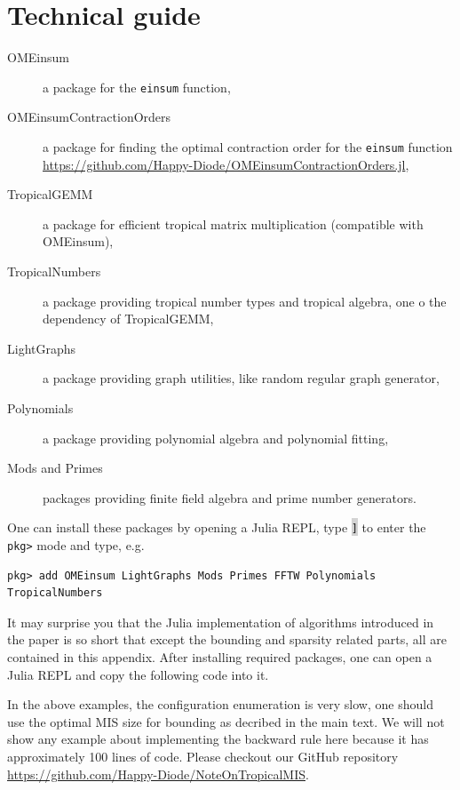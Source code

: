 \documentclass[review,onefignum,onetabnum]{siamart190516}
\newcommand{\<}{\langle}
\renewcommand{\>}{\rangle}
\newcounter{example}
\begin{document}



\appendix

\section{Technical guide}\label{sec:technical}
\begin{description}
	\item[OMEinsum] a package for the \texttt{einsum} function,
	\item[OMEinsumContractionOrders] a package for finding the optimal contraction order for the \texttt{einsum} function \\ \href{https://github.com/Happy-Diode/OMEinsumContractionOrders.jl}{https://github.com/Happy-Diode/OMEinsumContractionOrders.jl},
	\item[TropicalGEMM] a package for efficient tropical matrix multiplication (compatible with OMEinsum),
	\item[TropicalNumbers] a package providing tropical number types and tropical algebra, one o the dependency of TropicalGEMM,
	\item[LightGraphs] a package providing graph utilities, like random regular graph generator,
	\item[Polynomials] a package providing polynomial algebra and polynomial fitting,
	\item[Mods and Primes] packages providing finite field algebra and prime number generators.
\end{description}

One can install these packages by opening a Julia REPL, type \colorbox{lightgray}{\texttt{]}} to enter the \texttt{pkg>} mode and type, e.g.
\begin{lstlisting}
pkg> add OMEinsum LightGraphs Mods Primes FFTW Polynomials TropicalNumbers
\end{lstlisting}

It may surprise you that the Julia implementation of algorithms introduced in the paper is so short that except the bounding and sparsity related parts,
all are contained in this appendix. After installing required packages, one can open a Julia REPL and copy the following code into it.



In the above examples, the configuration enumeration is very slow, one should use the optimal MIS size for bounding as decribed in the main text.
We will not show any example about implementing the backward rule here because it has approximately 100 lines of code.
Please checkout our GitHub repository \href{https://github.com/Happy-Diode/NoteOnTropicalMIS}{https://github.com/Happy-Diode/NoteOnTropicalMIS}.
\end{document}
